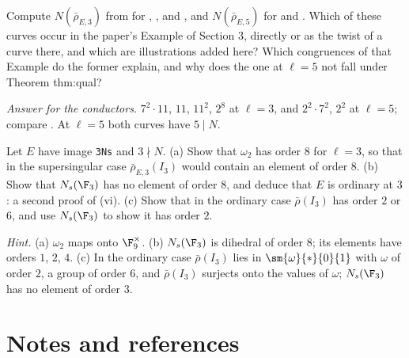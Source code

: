 \begin{exercise}\label{ex:galrep:conductors}
Compute $N(\bar\rho_{E,3})$ from  for , ,  and , and $N(\bar\rho_{E,5})$ for  and
. Which of these curves occur in the paper's Example of Section 3, directly or as the twist of a curve there, and which are illustrations
added here? Which congruences of that Example do the former explain, and why does the one at $\ell=5$ not fall under Theorem thm:qual?

\emph{Answer for the conductors.} $7^2\cdot11$, $11$, $11^2$, $2^8$ at $\ell=3$, and $2^2\cdot7^2$, $2^2$ at $\ell=5$; compare . At
$\ell=5$ both curves have $5\mid N$.
\end{exercise}

\begin{exercise}\label{ex:galrep:ns-ordinary}
Let $E$ have image \texttt{3Ns} and $3\nmid N$. (a) Show that $\omega_2$ has order $8$ for $\ell=3$, so that in the supersingular case $\bar\rho_{E,3}(I_3)$ would contain an
element of order $8$. (b) Show that $N_s(\F_3)$ has no element of order $8$, and deduce that $E$ is ordinary at $3$: a second proof of
(vi). (c) Show that in the ordinary case $\bar\rho(I_3)$ has order $2$ or $6$, and use $N_s(\F_3)$ to show it has order $2$.

\emph{Hint.} (a) $\omega_2$ maps onto $\F_9^\times$. (b) $N_s(\F_3)$ is dihedral of order $8$; its elements have orders $1$, $2$, $4$. (c) In the ordinary case
$\bar\rho(I_3)$ lies in $\sm{\omega}{*}{0}{1}$ with $\omega$ of order $2$, a group of order $6$, and $\bar\rho(I_3)$ surjects onto the values of $\omega$; $N_s(\F_3)$ has no element
of order $3$.
\end{exercise}

\section{Notes and references}\label{sec:galrep:notes}

